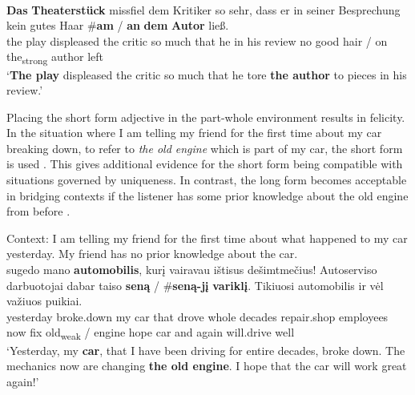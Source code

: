 \documentclass[output=paper,
modfonts
]{langscibook}
\begin{document}
\begin{exe}
	\ex \label{ex:sereikaite:53}
	 \citep[53]{Schwarz2009} \\
	\gll \textbf{Das} \textbf{Theaterstück} {missfiel} {dem} {Kritiker} {so} {sehr}, {dass} {er} {in} {seiner} {Besprechung} {kein} {gutes} {Haar} \textnormal{\#}\textbf{am} \textnormal{/} \textbf{an} \textbf{dem} \textbf{Autor} {ließ}.\\
	{the} {play} displeased the critic so much that he in his review no good hair  / {on} {the\textsubscript{strong}} {author} left\\
	\trans ‘\textbf{The play} displeased the critic so much that he tore \textbf{the author} to pieces in his review.’ 
\end{exe}


Placing the short form adjective in the part-whole environment results in felicity. In the situation where I am telling my friend for the first time about my car breaking down, to refer to \textit{the old engine} which is part of my car, the short form is used . This gives additional evidence for the short form being compatible with situations governed by uniqueness. In contrast, the long form becomes acceptable in bridging contexts if the listener has some prior knowledge about the old engine from before . 


\begin{exe}
	\ex \label{ex:sereikaite:54}
	Context: I am telling my friend for the first time about what happened to my car yesterday. My friend has no prior knowledge about the car. \\
	 {sugedo} {mano} {\textbf{automobilis}}, {kurį} {vairavau} {ištisus} {dešimtmečius}! {Autoserviso} {darbuotojai} {dabar} {taiso} \textbf{seną} \textnormal{/} \textnormal{\#}\textbf{seną-jį} {\textbf{variklį}}. {Tikiuosi} {automobilis} {ir} {vėl} {važiuos} {puikiai}.\\
	yesterday broke.down my {car} that drove whole decades repair.shop employees now fix {old\textsubscript{weak}} /  {engine} hope car and again will.drive well \\
	\trans `Yesterday, my \textbf{car}, that I have been driving for entire decades, broke down. The mechanics now are changing \textbf{the old engine}. I hope that the car will work great again!' 
\end{exe} \newpage
\end{document}
